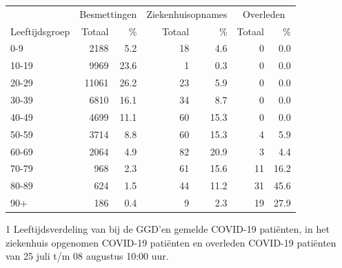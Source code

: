 \documentclass[
  english,
  man,floatsintext]{apa6}
\begin{document}
\begin{table}
\centering\begingroup\fontsize{11}{13}\selectfont

\begin{threeparttable}
\begin{tabular}{lrrrrrr}
\toprule
\multicolumn{1}{c}{ } & \multicolumn{2}{c}{Besmettingen} & \multicolumn{2}{c}{Ziekenhuisopnames} & \multicolumn{2}{c}{Overleden} \\
\cmidrule(l{3pt}r{3pt}){2-3} \cmidrule(l{3pt}r{3pt}){4-5} \cmidrule(l{3pt}r{3pt}){6-7}
Leeftijdsgroep & Totaal & \% & Totaal & \% & Totaal & \%\\
\midrule
0-9 & 2188 & 5.2 & 18 & 4.6 & 0 & 0.0\\
10-19 & 9969 & 23.6 & 1 & 0.3 & 0 & 0.0\\
20-29 & 11061 & 26.2 & 23 & 5.9 & 0 & 0.0\\
30-39 & 6810 & 16.1 & 34 & 8.7 & 0 & 0.0\\
40-49 & 4699 & 11.1 & 60 & 15.3 & 0 & 0.0\\
50-59 & 3714 & 8.8 & 60 & 15.3 & 4 & 5.9\\
60-69 & 2064 & 4.9 & 82 & 20.9 & 3 & 4.4\\
70-79 & 968 & 2.3 & 61 & 15.6 & 11 & 16.2\\
80-89 & 624 & 1.5 & 44 & 11.2 & 31 & 45.6\\
90+ & 186 & 0.4 & 9 & 2.3 & 19 & 27.9\\
\bottomrule
\end{tabular}
\begin{tablenotes}
\item[1] Leeftijdsverdeling van bij de GGD’en gemelde COVID-19 patiënten, in het ziekenhuis opgenomen COVID-19 patiënten en overleden COVID-19 patiënten van 25 juli t/m 08 augustus 10:00 uur.
\end{tablenotes}
\end{threeparttable}
\endgroup{}
\end{table}

\newpage
\end{document}
